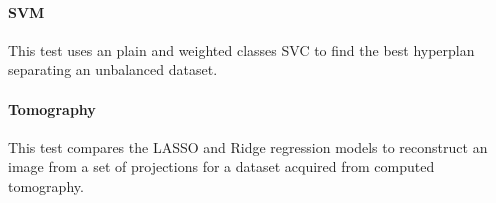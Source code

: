 \documentclass[11pt]{article}
\begin{document}


\paragraph{SVM}

This test uses an plain and weighted classes SVC to find the best hyperplan separating an unbalanced dataset.




\paragraph{Tomography}

This test compares the LASSO and Ridge regression models to 
reconstruct an image from a set of projections for a dataset
acquired from computed tomography.



\end{document}

